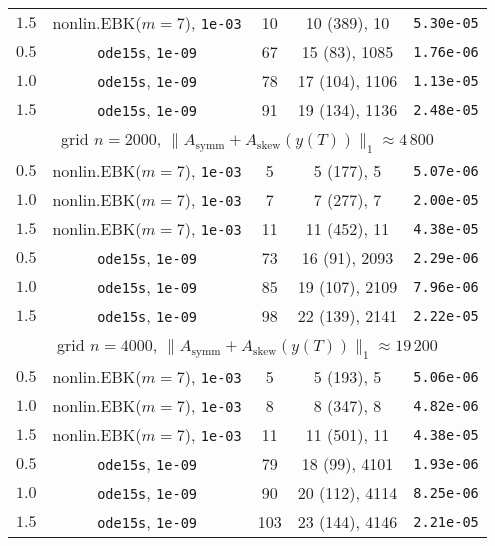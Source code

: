 \documentclass[sn-aps]{sn-jnl}
\theoremstyle{thmstyleone}%
\theoremstyle{thmstyletwo}%
\theoremstyle{thmstylethree}%
\newcommand{\Asymm}{A_{\mathrm{symm}}}
\newcommand{\Askew}{A_{\mathrm{skew}}}
\begin{document}
\begin{table}
\begin{tabular}{ccccc}
$1.5$  & nonlin.EBK($m=7$), {\tt 1e-03} & 10    & 10 (389), 10       & {\tt 5.30e-05} \\
$0.5$  & {\tt ode15s},  {\tt 1e-09}     & 67    & 15 (83), 1085      & {\tt 1.76e-06} \\
$1.0$  & {\tt ode15s},  {\tt 1e-09}     & 78    & 17 (104), 1106     & {\tt 1.13e-05} \\
$1.5$  & {\tt ode15s},  {\tt 1e-09}     & 91    & 19 (134), 1136     & {\tt 2.48e-05} \\
\hline
\multicolumn{5}{c}{grid $n=2000$, $\|\Asymm  + \Askew (y(T))\|_1\approx 4\,800$}\\
$0.5$  & nonlin.EBK($m=7$), {\tt 1e-03} & 5     & 5 (177), 5         & {\tt 5.07e-06} \\
$1.0$  & nonlin.EBK($m=7$), {\tt 1e-03} & 7     & 7 (277), 7         & {\tt 2.00e-05} \\
$1.5$  & nonlin.EBK($m=7$), {\tt 1e-03} & 11    & 11 (452), 11       & {\tt 4.38e-05} \\
$0.5$  & {\tt ode15s},  {\tt 1e-09}     & 73    & 16 (91), 2093      & {\tt 2.29e-06} \\
$1.0$  & {\tt ode15s},  {\tt 1e-09}     & 85    & 19 (107), 2109     & {\tt 7.96e-06} \\
$1.5$  & {\tt ode15s},  {\tt 1e-09}     & 98    & 22 (139), 2141     & {\tt 2.22e-05} \\
\hline
\multicolumn{5}{c}{grid $n=4000$, $\|\Asymm  + \Askew (y(T))\|_1\approx 19\,200$}\\
$0.5$  & nonlin.EBK($m=7$), {\tt 1e-03} & 5    & 5 (193), 5         & {\tt 5.06e-06} \\
$1.0$  & nonlin.EBK($m=7$), {\tt 1e-03} & 8    & 8 (347), 8         & {\tt 4.82e-06} \\
$1.5$  & nonlin.EBK($m=7$), {\tt 1e-03} & 11   & 11 (501), 11       & {\tt 4.38e-05} \\
$0.5$  & {\tt ode15s},  {\tt 1e-09}     & 79   & 18 (99), 4101      & {\tt 1.93e-06} \\
$1.0$  & {\tt ode15s},  {\tt 1e-09}     & 90   & 20 (112), 4114     & {\tt 8.25e-06} \\
$1.5$  & {\tt ode15s},  {\tt 1e-09}     & 103  & 23 (144), 4146     & {\tt 2.21e-05} \\
\hline 
\end{tabular}
\end{table}
\end{document}
